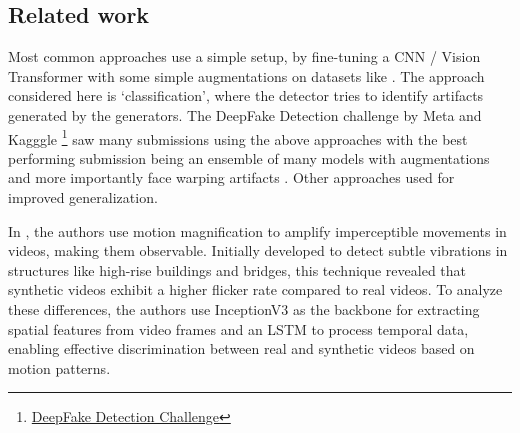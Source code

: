 \documentclass[10pt,twocolumn,letterpaper]{article}
\begin{document}







\subsection{Related work}
Most common approaches use a simple setup, by fine-tuning a CNN / Vision Transformer \cite{dosovitskiyImageWorth16x162021} with some simple augmentations on datasets like \cite{dolhanskyDeepFakeDetectionChallenge2020, rosslerFaceForensicsLargescaleVideo2018, zhengBreakingSemanticArtifacts2024, liCelebDFLargeScaleChallenging2020}. The approach considered here is `classification', where the detector tries to identify artifacts generated by the generators. The DeepFake Detection challenge by Meta and Kagggle \footnote{\href{https://ai.meta.com/datasets/dfdc/}{DeepFake Detection Challenge}} saw many submissions using the above approaches with the best performing submission \cite{seferbekovDeepfakeDetectionChallenge} being an ensemble of many models with augmentations and more importantly face warping artifacts \cite{liExposingDeepFakeVideos2019}. Other approaches used \cite{yunCutMixRegularizationStrategy2019a, hendrycks*AugMixSimpleData2019, zhangMixupEmpiricalRisk2018a} for improved generalization.

In \cite{feiExposingAIgeneratedVideos2021}, the authors use motion magnification to amplify imperceptible movements in videos, making them observable. Initially developed to detect subtle vibrations in structures like high-rise buildings and bridges, this technique revealed that synthetic videos exhibit a higher flicker rate compared to real videos. To analyze these differences, the authors use InceptionV3 \cite{szegedyRethinkingInceptionArchitecture2015} as the backbone for extracting spatial features from video frames and an LSTM \cite{hochreiterLongShortTermMemory1997} to process temporal data, enabling effective discrimination between real and synthetic videos based on motion patterns.
\end{document}
